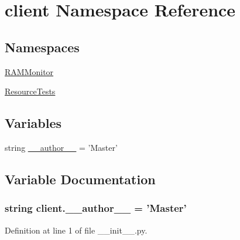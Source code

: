 \hypertarget{namespaceclient}{\section{client Namespace Reference}
\label{namespaceclient}
}
\subsection*{Namespaces}
\begin{DoxyCompactItemize}
\item 
\hyperlink{namespaceclient_1_1_r_a_m_monitor}{R\-A\-M\-Monitor}
\item 
\hyperlink{namespaceclient_1_1_resource_tests}{Resource\-Tests}
\end{DoxyCompactItemize}
\subsection*{Variables}
\begin{DoxyCompactItemize}
\item 
string \hyperlink{namespaceclient_a79ecd5be35a04c57f542965e484a29c0}{\-\_\-\-\_\-author\-\_\-\-\_\-} = 'Master'
\end{DoxyCompactItemize}


\subsection{Variable Documentation}
\hypertarget{namespaceclient_a79ecd5be35a04c57f542965e484a29c0}{
\subsubsection[{\-\_\-\-\_\-author\-\_\-\-\_\-}]{\setlength{\rightskip}{0pt plus 5cm}string client.\-\_\-\-\_\-author\-\_\-\-\_\- = 'Master'}}\label{namespaceclient_a79ecd5be35a04c57f542965e484a29c0}


Definition at line 1 of file \-\_\-\-\_\-init\-\_\-\-\_\-.\-py.

